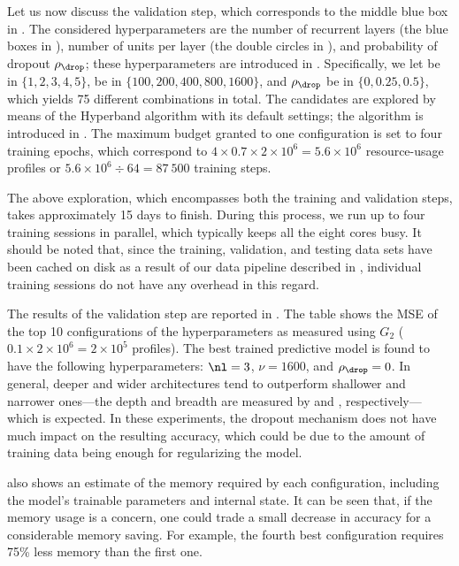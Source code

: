 Let us now discuss the validation step, which corresponds to the middle blue box
in . The considered hyperparameters are the number of
recurrent layers \nl (the blue boxes in ), number of units per
layer \nu (the double circles in ), and probability of dropout
$\rho_\drop$; these hyperparameters are introduced in .
Specifically, we let \nl be in $\{ 1, 2, 3, 4, 5 \}$, \nu be in $\{ 100, 200,
400, 800, 1600 \}$, and $\rho_\drop$ be in $\{ 0, 0.25, 0.5 \}$, which yields 75
different combinations in total. The candidates are explored by means of the
Hyperband algorithm with its default settings; the algorithm is introduced in
. The maximum budget granted to one configuration is set to
four training epochs, which correspond to $4 \times 0.7 \times 2 \times 10^6 =
5.6 \times 10^6$ resource-usage profiles or $5.6 \times 10^6 \div 64 = 87~500$
training steps.

The above exploration, which encompasses both the training and validation steps,
takes approximately 15 days to finish. During this process, we run up to four
training sessions in parallel, which typically keeps all the eight cores busy.
It should be noted that, since the training, validation, and testing data sets
have been cached on disk as a result of our data pipeline described in
, individual training sessions do not have any overhead in this
regard.

The results of the validation step are reported in . The
table shows the \ac{MSE} of the top 10 configurations of the hyperparameters as
measured using $G_2$ ($0.1 \times 2 \times 10^6 = 2 \times 10^5$ profiles). The
best trained predictive model is found to have the following hyperparameters:
$\nl = 3$, $\nu = 1600$, and $\rho_\drop = 0$. In general, deeper and wider
architectures tend to outperform shallower and narrower ones---the depth and
breadth are measured by \nl and \nu, respectively---which is expected. In these
experiments, the dropout mechanism does not have much impact on the resulting
accuracy, which could be due to the amount of training data being enough for
regularizing the model.

 also shows an estimate of the memory required by each
configuration, including the model's trainable parameters and internal state. It
can be seen that, if the memory usage is a concern, one could trade a small
decrease in accuracy for a considerable memory saving. For example, the fourth
best configuration requires 75\% less memory than the first one.

